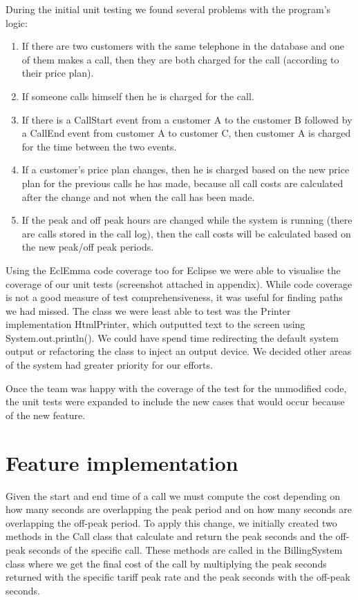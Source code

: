 \documentclass[pdftex,11pt,a4paper]{article}
\begin{document}
During the initial unit testing we found several problems with the program’s logic:

\begin{enumerate}
	\item If there are two customers with the same telephone in the database and one of them makes a call, then they are both charged for the call (according to their price plan).
	\item If someone calls himself then he is charged for the call.
	\item If there is a CallStart event from a customer A to the customer B followed by a CallEnd event from customer A to customer C, then customer A is charged for the time between the two events.
	\item If a customer’s price plan changes, then he is charged based on the new price plan for the previous calls he has made, because all call costs are calculated after the change and not when the call has been made.
	\item If the peak and off peak hours are changed while the system is running (there are calls stored in the call log), then the call costs will be calculated based on the new peak/off peak periods.
\end{enumerate}

Using the EclEmma code coverage too for Eclipse we were able to visualise the coverage of our unit tests (screenshot attached in appendix). While code coverage is not a good measure of test comprehensiveness, it was useful for finding paths we had missed. The class we were least able to test was the Printer implementation HtmlPrinter, which outputted text to the screen using System.out.println(). We could have spend time redirecting the default system output or refactoring the class to inject an output device. We decided other areas of the system had greater priority for our efforts.

Once the team was happy with the coverage of the test for the unmodified code, the unit tests were expanded to include the new cases that would occur because of the new feature. 

\section{Feature implementation}
Given the start and end time of a call we must compute the cost depending on how many seconds are overlapping the peak period and on how many seconds are overlapping the off-peak period. To apply this change, we initially created two methods in the Call class that calculate and return the peak seconds and the off-peak seconds of the specific call. These methods are called in the BillingSystem class where we get the final cost of the call by multiplying the peak seconds returned with the specific tariff peak rate and the peak seconds with the off-peak seconds.
\end{document}
